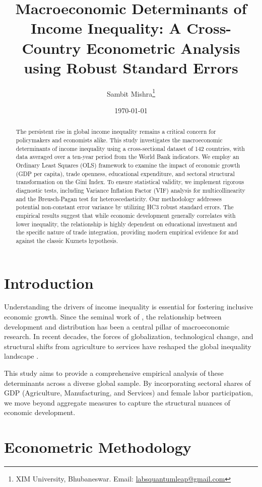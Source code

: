 \documentclass[12pt,a4paper]{article}
\title{Macroeconomic Determinants of Income Inequality: A Cross-Country Econometric Analysis using Robust Standard Errors}
\author{Sambit Mishra\thanks{XIM University, Bhubaneswar. Email: \href{mailto:labsquantumleap@gmail.com}{labsquantumleap@gmail.com}}}
\date{\today}
\begin{document}
\maketitle

\begin{abstract}
The persistent rise in global income inequality remains a critical concern for policymakers and economists alike. This study investigates the macroeconomic determinants of income inequality using a cross-sectional dataset of 142 countries, with data averaged over a ten-year period from the World Bank indicators. We employ an Ordinary Least Squares (OLS) framework to examine the impact of economic growth (GDP per capita), trade openness, educational expenditure, and sectoral structural transformation on the Gini Index. To ensure statistical validity, we implement rigorous diagnostic tests, including Variance Inflation Factor (VIF) analysis for multicollinearity and the Breusch-Pagan test for heteroscedasticity. Our methodology addresses potential non-constant error variance by utilizing HC3 robust standard errors. The empirical results suggest that while economic development generally correlates with lower inequality, the relationship is highly dependent on educational investment and the specific nature of trade integration, providing modern empirical evidence for and against the classic Kuznets hypothesis.
\end{abstract}

\section{Introduction}
Understanding the drivers of income inequality is essential for fostering inclusive economic growth. Since the seminal work of \cite{kuznets1955economic}, the relationship between development and distribution has been a central pillar of macroeconomic research. In recent decades, the forces of globalization, technological change, and structural shifts from agriculture to services have reshaped the global inequality landscape \citep{piketty2014capital}.

This study aims to provide a comprehensive empirical analysis of these determinants across a diverse global sample. By incorporating sectoral shares of GDP (Agriculture, Manufacturing, and Services) and female labor participation, we move beyond aggregate measures to capture the structural nuances of economic development.

\section{Econometric Methodology}
\end{document}
